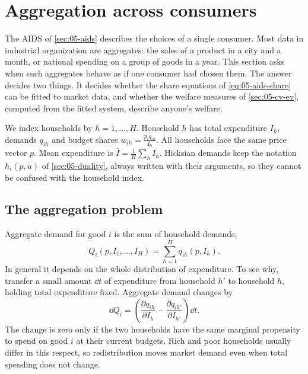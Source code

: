 \section{Aggregation across consumers}\label{sec:05-aggregation}

The AIDS of \cref{sec:05-aids} describes the choices of a single consumer. Most data in industrial
organization are aggregates: the sales of a product in a city and a month, or national spending on a
group of goods in a year. This section asks when such aggregates behave as if one consumer had chosen
them. The answer decides two things. It decides whether the share equations of \eqref{eq:05-aids-share}
can be fitted to market data, and whether the welfare measures of \cref{sec:05-cv-ev}, computed from the
fitted system, describe anyone's welfare.

We index households by $h = 1, \dots, H$. Household $h$ has total expenditure $I_h$, demands $q_{ih}$
and budget shares $w_{ih} = \frac{p_i q_{ih}}{I_h}$. All households face the same price vector $p$.
Mean expenditure is $\bar I = \frac{1}{H}\sum_h I_h$. Hicksian demands keep the notation $h_i(p,u)$ of
\cref{sec:05-duality}, always written with their arguments, so they cannot be confused with the household
index.

\subsection{The aggregation problem}\label{sec:05-agg-problem}

Aggregate demand for good $i$ is the sum of household demands,
\begin{equation}\label{eq:05-agg-demand}
  Q_i(p, I_1, \dots, I_H) = \sum_{h=1}^{H} q_{ih}(p, I_h).
\end{equation}
In general it depends on the whole distribution of expenditure. To see why, transfer a small amount
$\dd t$ of expenditure from household $h'$ to household $h$, holding total expenditure fixed. Aggregate
demand changes by
\begin{equation*}
  \dd Q_i = \left(\frac{\partial q_{ih}}{\partial I_h} - \frac{\partial q_{ih'}}{\partial I_{h'}}\right)\dd t .
\end{equation*}
The change is zero only if the two households have the same marginal propensity to spend on good $i$
at their current budgets. Rich and poor households usually differ in this respect, so redistribution
moves market demand even when total spending does not change.


